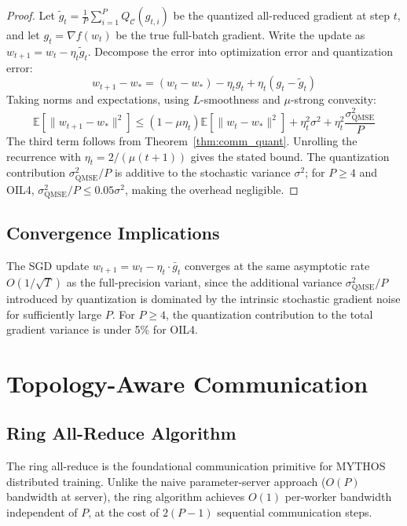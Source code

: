 \begin{proof}
Let $\tilde{g}_t = \frac{1}{P} \sum_{i=1}^P Q_{\mathcal{C}}(g_{t,i})$ be the quantized all-reduced gradient at step $t$, and let $g_t = \nabla f(w_t)$ be the true full-batch gradient. Write the update as $w_{t+1} = w_t - \eta_t \tilde{g}_t$. Decompose the error into optimization error and quantization error:
\[
w_{t+1} - w_* = (w_t - w_*) - \eta_t g_t + \eta_t (g_t - \tilde{g}_t)
\]
Taking norms and expectations, using $L$-smoothness and $\mu$-strong convexity:
\[
\mathbb{E}[\|w_{t+1} - w_*\|^2] \leq (1 - \mu\eta_t) \mathbb{E}[\|w_t - w_*\|^2] + \eta_t^2 \sigma^2 + \eta_t^2 \frac{\sigma^2_{\text{QMSE}}}{P}
\]
The third term follows from Theorem~\ref{thm:comm_quant}. Unrolling the recurrence with $\eta_t = 2/(\mu(t+1))$ gives the stated bound. The quantization contribution $\sigma^2_{\text{QMSE}} / P$ is additive to the stochastic variance $\sigma^2$; for $P \geq 4$ and OIL4, $\sigma^2_{\text{QMSE}} / P \leq 0.05 \sigma^2$, making the overhead negligible.
\end{proof}

\subsection{Convergence Implications}
\label{sec:conv_implications}

The SGD update $w_{t+1} = w_t - \eta_t \cdot \bar{g}_t$ converges at the same asymptotic rate $O(1/\sqrt{T})$ as the full-precision variant, since the additional variance $\sigma^2_{\text{QMSE}} / P$ introduced by quantization is dominated by the intrinsic stochastic gradient noise for sufficiently large $P$. For $P \geq 4$, the quantization contribution to the total gradient variance is under 5\% for OIL4.

\section{Topology-Aware Communication}
\label{sec:topology}

\subsection{Ring All-Reduce Algorithm}
\label{sec:ring_allreduce_algo}

The ring all-reduce is the foundational communication primitive for MYTHOS distributed training. Unlike the naive parameter-server approach ($O(P)$ bandwidth at server), the ring algorithm achieves $O(1)$ per-worker bandwidth independent of $P$, at the cost of $2(P-1)$ sequential communication steps.

